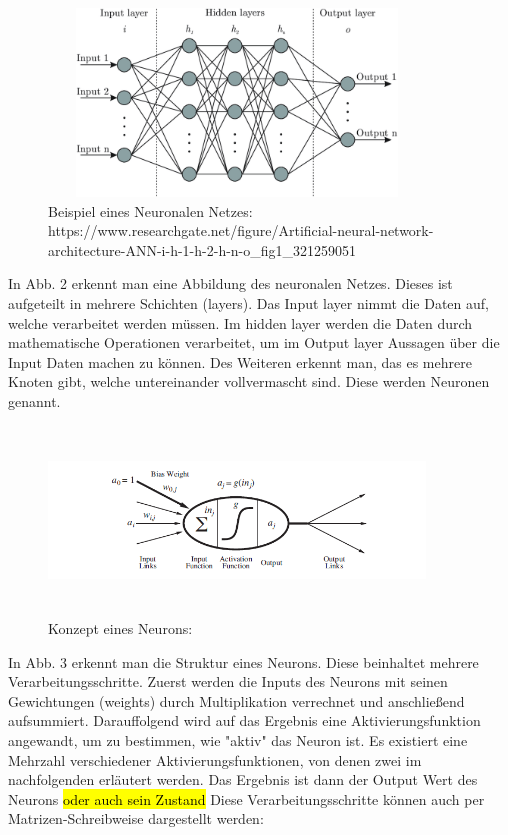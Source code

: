 \begin{figure}
    \centering
    \includegraphics[height= 5cm, width = 10cm]{Pictures/NN_Concept.png}
    \caption{Beispiel eines Neuronalen Netzes: https://www.researchgate.net/figure/Artificial-neural-network-architecture-ANN-i-h-1-h-2-h-n-o_fig1_321259051}
\end{figure}


In Abb. 2 erkennt man eine Abbildung des neuronalen Netzes. Dieses ist aufgeteilt in mehrere Schichten (layers). Das Input layer nimmt die Daten auf, welche verarbeitet werden müssen. Im hidden layer werden die Daten durch mathematische Operationen verarbeitet, um im Output layer Aussagen über die Input Daten machen zu können. Des Weiteren erkennt man, das es mehrere Knoten gibt, welche untereinander vollvermascht sind. Diese werden Neuronen genannt. 

\begin{figure}
    \centering
    \includegraphics[height= 5cm, width = 10cm]{Pictures/Neuron.png}
    \caption{Konzept eines Neurons: }
\end{figure}

In Abb. 3 erkennt man die Struktur eines Neurons. Diese beinhaltet mehrere Verarbeitungsschritte. Zuerst werden die Inputs des Neurons mit seinen Gewichtungen (weights) durch Multiplikation verrechnet und anschließend aufsummiert. Darauffolgend wird auf das Ergebnis eine Aktivierungsfunktion angewandt, um zu bestimmen, wie "aktiv" das Neuron ist. Es existiert eine Mehrzahl verschiedener Aktivierungsfunktionen, von denen zwei im nachfolgenden erläutert werden. Das Ergebnis ist dann der Output Wert des Neurons \hl{oder auch sein Zustand}
Diese Verarbeitungsschritte können auch per Matrizen-Schreibweise dargestellt werden: 


